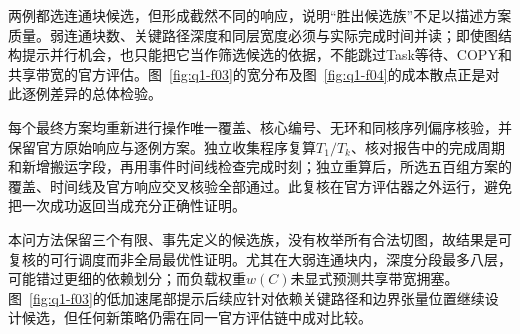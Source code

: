 两例都选连通块候选，但形成截然不同的响应，说明“胜出候选族”不足以描述方案质量。弱连通块数、关键路径深度和同层宽度必须与实际完成时间并读；即使图结构提示并行机会，也只能把它当作筛选候选的依据，不能跳过Task等待、COPY和共享带宽的官方评估。图~\ref{fig:q1-f03}的宽分布及图~\ref{fig:q1-f04}的成本散点正是对此逐例差异的总体检验。

每个最终方案均重新进行操作唯一覆盖、核心编号、无环和同核序列偏序核验，并保留官方原始响应与逐例方案。独立收集程序复算$T_1/T_k$、核对报告中的完成周期和新增搬运字段，再用事件时间线检查完成时刻；独立重算后，所选五百组方案的覆盖、时间线及官方响应交叉核验全部通过。此复核在官方评估器之外运行，避免把一次成功返回当成充分正确性证明。

本问方法保留三个有限、事先定义的候选族，没有枚举所有合法切图，故结果是可复核的可行调度而非全局最优性证明。尤其在大弱连通块内，深度分段最多八层，可能错过更细的依赖划分；而负载权重$w(C)$未显式预测共享带宽拥塞。图~\ref{fig:q1-f03}的低加速尾部提示后续应针对依赖关键路径和边界张量位置继续设计候选，但任何新策略仍需在同一官方评估链中成对比较。






